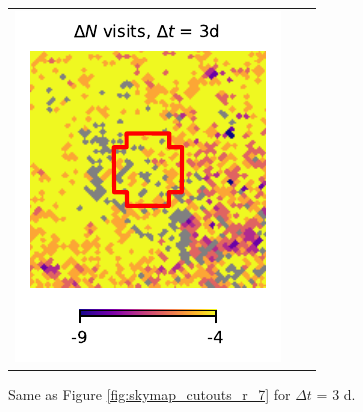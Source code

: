 \documentclass[preprintm,linenumbers]{aastex631}
\begin{document}
\begin{figure}
\begin{tabular}{  c c c}
				\includegraphics{results/skymaps_cutout/skymaps_cutout_delta_first_year_one_snap_v4_0_10yrs_db_noDD_noTwi_tscale-3_nside-256_doAllTemplateMetrics_reduceCount_r_GP_noDD_noTwi.pdf} \\
			\end{tabular}
			\caption{
				 Same as Figure \ref{fig:skymap_cutouts_r_7} for $\Delta t$ = 3 d.  
			}
   \label{fig:skymap_cutouts_r_3}
		\end{figure}
        
\end{document}
